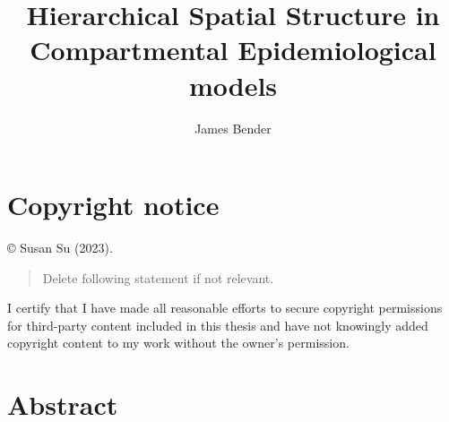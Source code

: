\documentclass[
  letterpaper,
  DIV=11,
  numbers=noendperiod]{scrreprt}
\title{Hierarchical Spatial Structure in Compartmental Epidemiological
models}
\author{James Bender}
\date{}
\renewcommand*\contentsname{Table of contents}
\newcommand\contentsname{Table of contents}
\begin{document}
\maketitle
\ifdefined\Shaded\renewenvironment{Shaded}{\begin{tcolorbox}[boxrule=0pt, frame hidden, sharp corners, borderline west={3pt}{0pt}{shadecolor}, breakable, interior hidden, enhanced]}{\end{tcolorbox}}\fi

\renewcommand*\contentsname{Sections}
{
\hypersetup{linkcolor=}
\setcounter{tocdepth}{2}
\tableofcontents
}

\hypertarget{copyright-notice}{%
\chapter*{Copyright notice}\label{copyright-notice}}


© Susan Su (2023).

\begin{quote}
Delete following statement if not relevant.
\end{quote}

I certify that I have made all reasonable efforts to secure copyright
permissions for third-party content included in this thesis and have not
knowingly added copyright content to my work without the owner's
permission.


\hypertarget{abstract}{%
\chapter*{Abstract}\label{abstract}}

\end{document}

